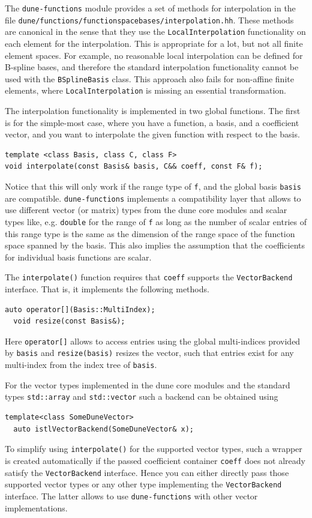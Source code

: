 \documentclass[a4paper,10pt,headings=normal,bibliography=totoc]{scrartcl}
\newcommand{\cpp}[1]{\lstinline[basicstyle=\ttfamily]!#1!}
\newcommand{\dunemodule}[1]{\texttt{#1}}
\newcommand{\file}[1]{\texttt{#1}}
\begin{document}
The \dunemodule{dune-functions} module provides a set of methods for interpolation in the file
\file{dune/functions/functionspacebases/interpolation.hh}.  These methods are canonical in the sense that
they use the \cpp{LocalInterpolation} functionality on each element for the interpolation.  This is appropriate
for a lot, but not all finite element spaces.  For example, no reasonable local interpolation can be defined
for B-spline bases, and therefore the standard interpolation functionality cannot be used with the
\cpp{BSplineBasis} class.
This approach also fails for non-affine finite elements, where \cpp{LocalInterpolation} is
missing an essential transformation.

The interpolation functionality is implemented in two global functions.
The first is for the simple-most case, where you have a function,
a basis, and a coefficient vector, and you want to interpolate
the given function with respect to the basis.

\begin{lstlisting}[style=Interface]
template <class Basis, class C, class F>
void interpolate(const Basis& basis, C&& coeff, const F& f);
\end{lstlisting}

Notice that this will only work if the range type of \cpp{f},
and the global basis \cpp{basis} are compatible.
\dunemodule{dune-functions} implements a compatibility layer
that allows to use different vector (or matrix) types
from the dune core modules and scalar types like, e.g. \cpp{double}
for the range of \cpp{f} as long as the number of scalar entries
of this range type is the same as the dimension of the range space of
the function space spanned by the basis.
This also implies the assumption that the coefficients for
individual basis functions are scalar.

The \cpp{interpolate()} function
requires that \cpp{coeff} supports the \cpp{VectorBackend}
interface. That is, it implements the following methods.
\begin{lstlisting}[style=Interface]
  auto operator[](Basis::MultiIndex);
  void resize(const Basis&);
\end{lstlisting}
Here \cpp{operator[]} allows to access entries using the
global multi-indices provided by \cpp{basis} and \cpp{resize(basis)}
resizes the vector, such that entries exist for any multi-index
from the index tree of \cpp{basis}.

For the vector types implemented in the dune core modules and
the standard types \cpp{std::array} and \cpp{std::vector} such
a backend can be obtained using
\begin{lstlisting}[style=Interface]
  template<class SomeDuneVector>
  auto istlVectorBackend(SomeDuneVector& x);
\end{lstlisting}
To simplify using \cpp{interpolate()} for the supported vector types,
such a wrapper is created automatically if the passed coefficient
container \cpp{coeff} does not already satisfy the \cpp{VectorBackend}
interface. Hence you can either directly pass those supported
vector types or any other type implementing the \cpp{VectorBackend}
interface. The latter allows to use \dunemodule{dune-functions}
with other vector implementations.
\end{document}
